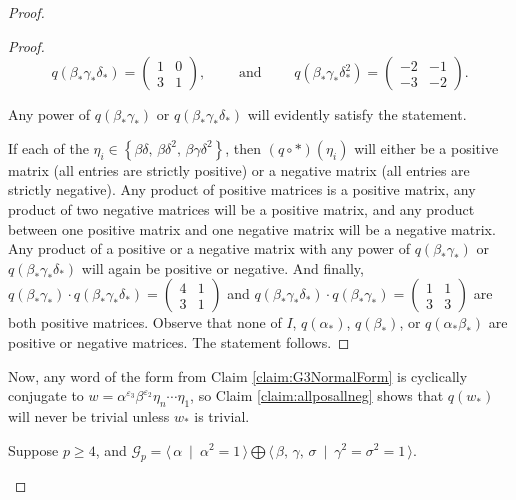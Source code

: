 \documentclass{amsart}     %
\newcommand{\set}[1]{ \left\{ #1 \right\} }
\theoremstyle{definition}
\begin{document}
\begin{proof}
\begin{description}
\begin{proof}
\[q (\beta_* \gamma_* \delta_*) = \begin{pmatrix} 1 & 0  \\ 3 & 1\end{pmatrix},\qquad  \mbox{ and } \qquad q (\beta_* \gamma_* \delta_*^2) = \begin{pmatrix} -2 & -1  \\ -3 & -2\end{pmatrix}.\]

Any power of $q( \beta_* \gamma_*)$ or $q(\beta_* \gamma_* \delta_*)$ will evidently satisfy the statement. 

If each of the $\eta_i \in \set{\beta \delta, \, \beta \delta^2, \, \beta \gamma \delta^2}$, then $(q \circ *)(\eta_i)$ will either be a positive matrix (all entries are strictly positive) or a negative matrix (all entries are strictly negative). Any product of positive matrices is a positive matrix, any product of two negative matrices will be a positive matrix, and any product between one positive matrix and one negative matrix will be a negative matrix. Any product of a positive or a negative matrix with any power of $q(\beta_* \gamma_*)$ or $q(\beta_* \gamma_* \delta_*)$ will again be positive or negative. And finally, $q(\beta_* \gamma_*) \cdot q(\beta_* \gamma_* \delta_*) = \begin{pmatrix} 4 & 1 \\ 3 & 1 \end{pmatrix}$ and $q(\beta_* \gamma_* \delta_*) \cdot q( \beta_* \gamma_*) = \begin{pmatrix} 1 & 1 \\ 3 & 3 \end{pmatrix}$ are both positive matrices. Observe that none of $I$, $q(\alpha_*)$, $q(\beta_*)$, or $q(\alpha_* \beta_*)$ are positive or negative matrices. The statement follows.
\end{proof}


Now, any word of the form from Claim \ref{claim:G3NormalForm} is cyclically conjugate to $w = \alpha^{\varepsilon_3} \beta^{\varepsilon_2} \eta_n \cdots \eta_1$, so Claim \ref{claim:allposallneg} shows that $q(w_*)$ will never be trivial unless $w_*$ is trivial.

\item[Case 3] Suppose $p \geq 4$, and $\mathcal{G}_p = \langle \, \alpha \ \mid \ \alpha^2 = 1 \, \rangle \bigoplus \langle \, \beta, \, \gamma, \, \sigma \ \mid \ \gamma^2 = \sigma^2 = 1\, \rangle$. 


\end{description}
\end{proof}
\end{document}
